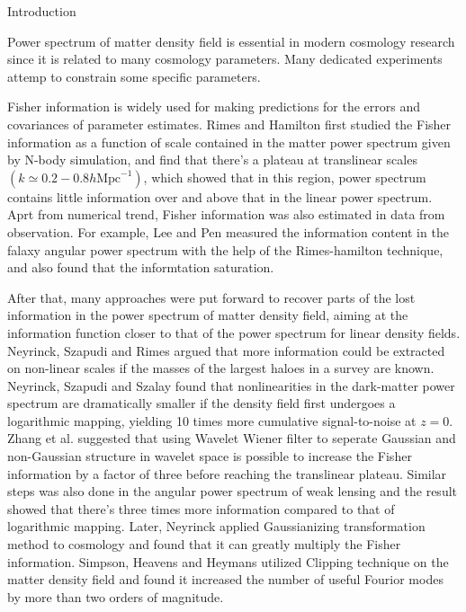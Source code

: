 \begin{section}{Introduction}
  \label{sec:introduction}  

  Power spectrum of matter density field is essential in modern cosmology research since it is related to many cosmology parameters. Many dedicated experiments attemp to constrain some specific parameters. 

  Fisher information is widely used for making predictions for the errors and covariances of parameter estimates. Rimes and Hamilton\cite{bib:Rimes2006} first studied the Fisher information as a function of scale contained in the matter power spectrum given by N-body simulation, and find that there's a plateau at translinear scales $(k \simeq 0.2-0.8 h\mathrm{Mpc}^{-1})$, which showed that in this region, power spectrum contains little information over and above that in the linear power spectrum. Aprt from numerical trend, Fisher information was also estimated in data from observation. For example, Lee and Pen \cite{bib:Lee2008} measured the information content in the falaxy angular power spectrum with the help of the Rimes-hamilton technique, and also found that the informtation saturation. 

  After that, many approaches were put forward to recover parts of the lost information in the power spectrum of matter density field, aiming at the information function closer to that of the power spectrum for linear density fields. Neyrinck, Szapudi and Rimes \cite{bib:Mark2006} argued that more information could be extracted on non-linear scales if the masses of the largest haloes in a survey are known. Neyrinck, Szapudi and Szalay \cite{bib:Mark2009} found that nonlinearities in the dark-matter power spectrum are dramatically smaller if the density field first undergoes a logarithmic mapping, yielding 10 times more cumulative signal-to-noise at $z = 0$. Zhang et al. \cite{bib:Zhang2011} suggested that using Wavelet Wiener filter to seperate Gaussian and non-Gaussian structure in wavelet space is possible to increase the Fisher information by a factor of three before reaching the translinear plateau. Similar steps was also done in the angular power spectrum of weak lensing \cite{bib:Yu2012} and the result showed that there's three times more information compared to that of logarithmic mapping. Later, Neyrinck \cite{bib:Mark2014} applied Gaussianizing transformation method to cosmology and found that it can greatly multiply the Fisher information. Simpson, Heavens and Heymans utilized Clipping \cite{bib:Fergus2013} technique on the matter density field and found it increased the number of useful Fourior modes by more than two orders of magnitude.


\end{section}
